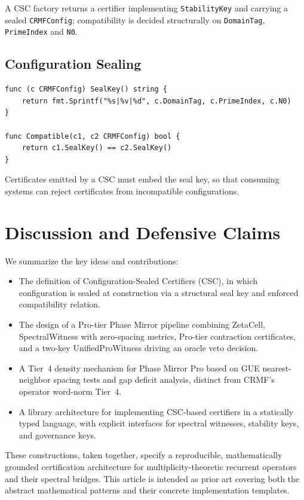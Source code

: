 \documentclass[11pt]{article}
\begin{document}
A CSC factory returns a certifier implementing \verb|StabilityKey| and
carrying a sealed \verb|CRMFConfig|; compatibility is decided structurally
on \verb|DomainTag|, \verb|PrimeIndex| and \verb|N0|.

\subsection{Configuration Sealing}

\begin{verbatim}
func (c CRMFConfig) SealKey() string {
    return fmt.Sprintf("%s|%v|%d", c.DomainTag, c.PrimeIndex, c.N0)
}

func Compatible(c1, c2 CRMFConfig) bool {
    return c1.SealKey() == c2.SealKey()
}
\end{verbatim}

Certificates emitted by a CSC must embed the seal key, so that consuming
systems can reject certificates from incompatible configurations.

\section{Discussion and Defensive Claims}

We summarize the key ideas and contributions:

\begin{itemize}[leftmargin=*]
  \item The definition of Configuration-Sealed Certifiers (CSC), in which
        configuration is sealed at construction via a structural seal key
        and enforced compatibility relation.
  \item The design of a Pro-tier Phase Mirror pipeline combining ZetaCell,
        SpectralWitness with zero-spacing metrics, Pro-tier contraction
        certificates, and a two-key UnifiedProWitness driving an oracle
        veto decision.
  \item A Tier~4 density mechanism for Phase Mirror Pro based on GUE
        nearest-neighbor spacing tests and gap deficit analysis, distinct
        from CRMF's operator word-norm Tier~4.
  \item A library architecture for implementing CSC-based certifiers in
        a statically typed language, with explicit interfaces for spectral
        witnesses, stability keys, and governance keys.
\end{itemize}

These constructions, taken together, specify a reproducible, mathematically
grounded certification architecture for multiplicity-theoretic recurrent
operators and their spectral bridges. This article is intended as prior
art covering both the abstract mathematical patterns and their concrete
implementation templates.
\end{document}
